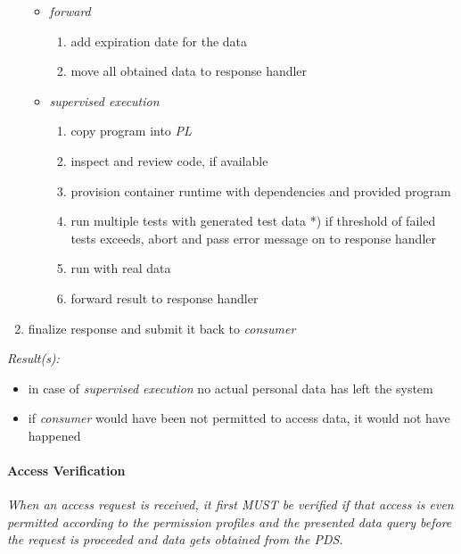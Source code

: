 \documentclass[12pt,english,a4paper,titlepage,cleardoublepage=empty,dottedtoc]{report}
\providecommand{\tightlist}{%
  \setlength{\itemsep}{0pt}\setlength{\parskip}{0pt}}
\begin{document}
\begin{enumerate}
  \begin{itemize}
  \tightlist
  \item
    \emph{forward}

    \begin{enumerate}
    \def\labelenumii{\arabic{enumii})}
    \tightlist
    \item
      add expiration date for the data
    \item
      move all obtained data to response handler
    \end{enumerate}
  \item
    \emph{supervised execution}

    \begin{enumerate}
    \def\labelenumii{\arabic{enumii})}
    \setcounter{enumii}{-1}
    \tightlist
    \item
      copy program into \emph{PL}
    \item
      inspect and review code, if available
    \item
      provision container runtime with dependencies and provided program
    \item
      run multiple tests with generated test data *) if threshold of
      failed tests exceeds, abort and pass error message on to response
      handler
    \item
      run with real data
    \item
      forward result to response handler
    \end{enumerate}
  \end{itemize}
\item
  finalize response and submit it back to \emph{consumer}
\end{enumerate}

\emph{Result(s):}

\begin{itemize}
\tightlist
\item
  in case of \emph{supervised execution} no actual personal data has
  left the system
\item
  if \emph{consumer} would have been not permitted to access data, it
  would not have happened
\end{itemize}

\hypertarget{access-verification}{\paragraph{Access
Verification}\label{access-verification}}

\emph{When an access request is received, it first MUST be verified if
that access is even permitted according to the permission profiles and
the presented data query before the request is proceeded and data gets
obtained from the PDS.}
\end{document}
